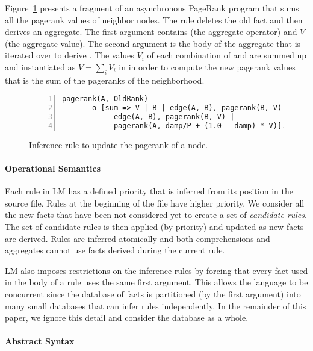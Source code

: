 Figure~\ref{code:pagerank} presents a fragment of an asynchronous PageRank
program that sums all the pagerank values of neighbor nodes. The rule deletes
the old  fact and then derives an aggregate. The first
argument contains  (the aggregate operator) and $V$ (the
aggregate value). The second argument 
is the body of the aggregate that is iterated over to derive . The values $V_i$ of each combination of 
and  are summed up and instantiated as $V = \sum_i V_i$ in
 in order to compute
the new pagerank values that is the sum of the pageranks of the neighborhood.

\begin{figure}[h]
\begin{Verbatim}[numbers=left,fontsize=\stuffsize,xleftmargin=\stuffleftmargin]
pagerank(A, OldRank)
      -o [sum => V | B | edge(A, B), pagerank(B, V) |
            edge(A, B), pagerank(B, V) |
            pagerank(A, damp/P + (1.0 - damp) * V)].
\end{Verbatim}
   \caption{Inference rule to update the pagerank of a node.}
   \label{code:pagerank}
\end{figure}

\paragraph{Operational Semantics} Each rule in LM has a defined priority that is
inferred from its position in the source file.  Rules at the beginning of the
file have higher priority. We consider all the new facts that have been not
considered yet to create a set of \emph{candidate rules}.  The set of candidate
rules is then applied (by priority) and updated as new facts are derived.  Rules
are inferred atomically and both comprehensions and aggregates cannot use facts
derived during the current rule.

LM also imposes restrictions on the inference rules by forcing that every fact
used in the body of a rule uses the same first argument. This allows the
language to be concurrent since the database of facts is partitioned (by the
first argument) into many small databases that can infer rules independently.
In the remainder of this paper, we ignore this detail and consider the database
as a whole.

\paragraph{Abstract Syntax}

